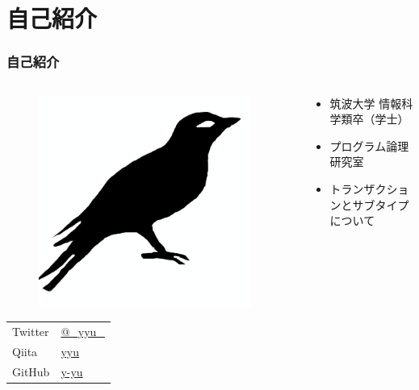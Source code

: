 \section{自己紹介}
\begin{frame}
  \frametitle{自己紹介}
  
  \begin{columns}
    \begin{column}{0.4\textwidth}
      \begin{center}
        \begin{figure}
          \includegraphics[width=0.95\textwidth]{img/bird2x.png}
        \end{figure}
      \end{center}
 
      \begin{table}[h]
        \begin{tabular}{ll}
          Twitter & \href{https://twitter.com/\_yyu\_}{@\_yyu\_} \\
          Qiita &  \href{https://qiita.com/yyu}{yyu} \\
          GitHub &  \href{https://github.com/y-yu}{y-yu} \\
        \end{tabular}
      \end{table}
    \end{column}
    \begin{column}{0.6\textwidth}
      \pause
      \begin{itemize}
        \item<+-> 筑波大学 情報科学類卒（学士）
        \item<+-> プログラム論理研究室
        \item<+-> トランザクションとサブタイプについて
      \end{itemize}
    \end{column}
  \end{columns}
\end{frame}

